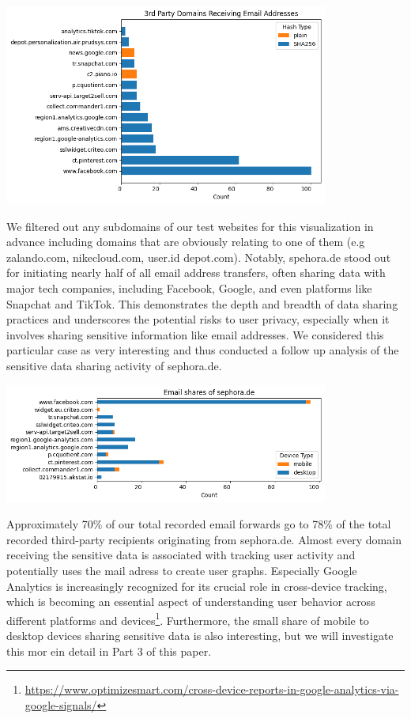 \includegraphics[width=0.8\textwidth]{./assets/thirdpartydomainsreceivingemailaddresses.png}

We filtered out any subdomains of our test websites for this visualization in advance including domains that are obviously relating to one of them (e.g zalando.com, nikecloud.com, user.id depot.com). Notably, spehora.de stood out for initiating nearly half of all email address transfers, often sharing data with major tech companies, including Facebook, Google, and even platforms like Snapchat and TikTok. This demonstrates the depth and breadth of data sharing practices and underscores the potential risks to user privacy, especially when it involves sharing sensitive information like email addresses. We considered this particular case as very interesting and thus conducted a follow up analysis of the sensitive data sharing activity of sephora.de.

\includegraphics[width=0.8\textwidth]{./assets/sephoracase.png}

Approximately 70\% of our total recorded email forwards go to 78\% of the total recorded third-party recipients originating from sephora.de. Almost every domain receiving the sensitive data is associated with tracking user activity and potentially uses the mail adress to create user graphs. Especially Google Analytics is increasingly recognized for its crucial role in cross-device tracking, which is becoming an essential aspect of understanding user behavior across different platforms and devices\footnote{\href{https://www.optimizesmart.com/cross-device-reports-in-google-analytics-via-google-signals/}{https://www.optimizesmart.com/cross-device-reports-in-google-analytics-via-google-signals/}}. Furthermore, the small share of mobile to desktop devices sharing sensitive data is also interesting, but we will investigate this mor ein detail in Part 3 of this paper.

